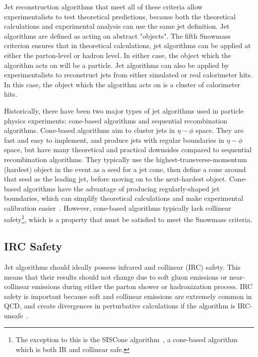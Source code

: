 Jet reconstruction algorithms that meet all of these criteria allow experimentalists to test theoretical predictions, because both the theoretical calculations and experimental analysis can use the same jet definition.
Jet algorithms are defined as acting on abstract "objects".
The fifth Snowmass criterion ensures that in theoretical calculations, jet algorithms can be applied at either the parton-level or hadron level.
In either case, the object which the algorithm acts on will be a particle.
Jet algorithms can also be applied by experimentalists to reconstruct jets from either simulated or real calorimeter hits.
In this case, the object which the algorithm acts on is a cluster of calorimeter hits.

Historically, there have been two major types of jet algorithms used in particle physics experiments: cone-based algorithms and sequential recombination algorithms.
Cone-based algorithms aim to cluster jets in $\eta-\phi$ space.
They are fast and easy to implement, and produce jets with regular boundaries in $\eta-\phi$ space, but have many theoretical and practical downsides compared to sequential recombination algorithms.
They typically use the highest-transverse-momentum (hardest) object in the event as a seed for a jet cone, then define a cone around that seed as the leading jet, before moving on to the next-hardest object.
Cone-based algorithms have the advantage of producing regularly-shaped jet boundaries, which can simplify theoretical calculations and make experimental calibration easier~\cite{jet-cone-algo}.
However, cone-based algorithms typically lack collinear safety\footnote{The exception to this is the SISCone algorithm~\cite{jet-siscone-algorithm}, a cone-based algorithm which is both IR and collinear safe.}, which is a property that must be satisfied to meet the Snowmass criteria.

\subsection{IRC Safety}\label{subsec:jet_irc_safety}

Jet algorithms should ideally possess infrared and collinear (IRC) safety.
This means that their results should not change due to soft gluon emissions or near-collinear emissions during either the parton shower or hadronization process.
IRC safety is important because soft and collinear emissions are extremely common in QCD, and create divergences in perturbative calculations if the algorithm is IRC-unsafe~\cite{jet-jetography}.

